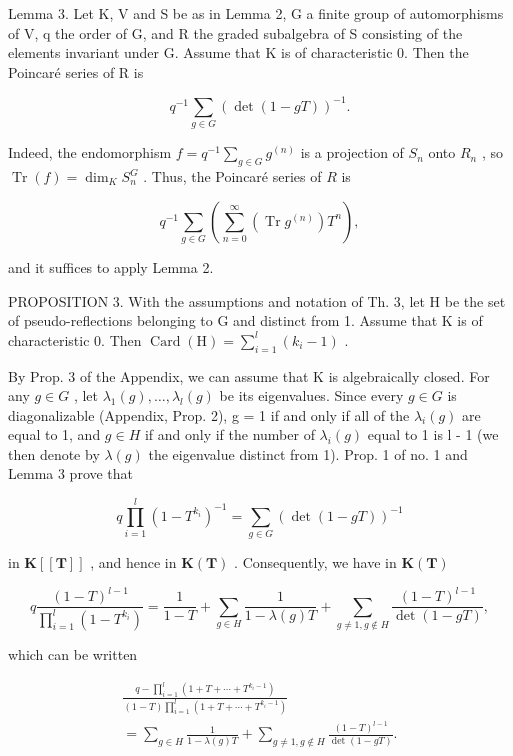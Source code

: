 Lemma 3. Let K, V and S be as in Lemma 2, G a finite group of automorphisms of V, q the order of G, and R the graded subalgebra of S consisting of the elements invariant under G. Assume that K is of characteristic 0. Then the Poincaré series of R is

\[
q ^ {- 1} \sum_ {g \in G} (\det (1 - g T)) ^ {- 1}.
\]

Indeed, the endomorphism \(f = q^{-1} \sum_{g \in G} g^{(n)}\) is a projection of \(S_n\) onto \(R_n\) , so \(\operatorname{Tr}(f) = \dim_K S_n^G\) . Thus, the Poincaré series of \(R\) is

\[
q ^ {- 1} \sum_ {g \in G} \left(\sum_ {n = 0} ^ {\infty} (\operatorname{Tr} g ^ {(n)}) T ^ {n}\right),
\]

and it suffices to apply Lemma 2.

PROPOSITION 3. With the assumptions and notation of Th. 3, let H be the set of pseudo-reflections belonging to G and distinct from 1. Assume that K is of characteristic 0. Then \(\operatorname{Card}(\mathrm{H}) = \sum_{i=1}^{l}(k_i - 1)\) .

By Prop. 3 of the Appendix, we can assume that K is algebraically closed. For any \(g \in G\) , let \(\lambda_{1}(g), \ldots, \lambda_{l}(g)\) be its eigenvalues. Since every \(g \in G\) is diagonalizable (Appendix, Prop. 2), g = 1 if and only if all of the \(\lambda_{i}(g)\) are equal to 1, and \(g \in H\) if and only if the number of \(\lambda_{i}(g)\) equal to 1 is l - 1 (we then denote by \(\lambda(g)\) the eigenvalue distinct from 1). Prop. 1 of no. 1 and Lemma 3 prove that

\[
q \prod_ {i = 1} ^ {l} (1 - T ^ {k _ {i}}) ^ {- 1} = \sum_ {g \in G} (\det (1 - g T)) ^ {- 1}\tag{16}
\]

in \(\mathbf{K}[[\mathbf{T}]]\) , and hence in \(\mathbf{K}(\mathbf{T})\) . Consequently, we have in \(\mathbf{K}(\mathbf{T})\)

\[
q \frac {(1 - T) ^ {l - 1}}{\prod_ {i = 1} ^ {l} (1 - T ^ {k _ {i}})} = \frac {1}{1 - T} + \sum_ {g \in H} \frac {1}{1 - \lambda (g) T} + \sum_ {g \neq 1, g \notin H} \frac {(1 - T) ^ {l - 1}}{\det (1 - g T)},
\]

which can be written

\[
\begin{array}{c} \frac {q - \prod_ {i = 1} ^ {l} (1 + T + \cdots + T ^ {k _ {i} - 1})}{(1 - T) \prod_ {i = 1} ^ {l} (1 + T + \cdots + T ^ {k _ {i} - 1})} \\ = \sum_ {g \in H} \frac {1}{1 - \lambda (g) T} + \sum_ {g \neq 1, g \notin H} \frac {(1 - T) ^ {l - 1}}{\det (1 - g T)}. \end{array}\tag{17}
\]

